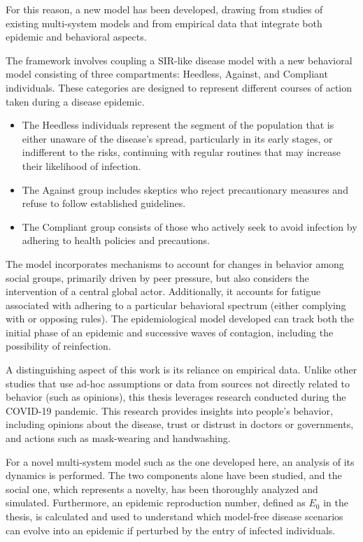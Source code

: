 For this reason, a new model has been developed, drawing from studies of existing multi-system models and from empirical data that integrate both epidemic and behavioral aspects.

The framework involves coupling a SIR-like disease model with a new behavioral model consisting of three compartments: Heedless, Against, and Compliant individuals. These categories are designed to represent different courses of action taken during a disease epidemic.
\begin{itemize}
	\item The Heedless individuals represent the segment of the population that is either unaware of the disease’s spread, particularly in its early stages, or indifferent to the risks, continuing with regular routines that may increase their likelihood of infection.
	\item The Against group includes skeptics who reject precautionary measures and refuse to follow established guidelines.
	\item The Compliant group consists of those who actively seek to avoid infection by adhering to health policies and precautions.

\end{itemize}

The model incorporates mechanisms to account for changes in behavior among social groups, primarily driven by peer pressure, but also considers the intervention of a central global actor. Additionally, it accounts for fatigue associated with adhering to a particular behavioral spectrum (either complying with or opposing rules). The epidemiological model developed can track both the initial phase of an epidemic and successive waves of contagion, including the possibility of reinfection.

A distinguishing aspect of this work is its reliance on empirical data. Unlike other studies that use ad-hoc assumptions or data from sources not directly related to behavior (such as opinions), this thesis leverages research conducted during the COVID-19 pandemic. This research provides insights into people's behavior, including opinions about the disease, trust or distrust in doctors or governments, and actions such as mask-wearing and handwashing.

For a novel multi-system model such as the one developed here, an analysis of its dynamics is performed. The two components alone have been studied, and the social one, which represents a novelty, has been thoroughly analyzed and simulated.
Furthermore, an epidemic reproduction number, defined as $E_0$ in the thesis, is calculated and used to understand which model-free disease scenarios can evolve into an epidemic if perturbed by the entry of infected individuals.

